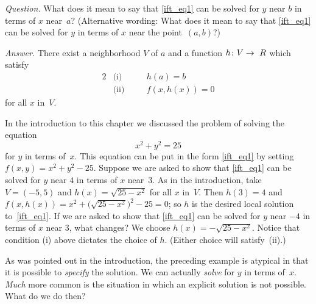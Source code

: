 \noindent\emph{Question.} What does it mean to say that \eqref{ift_eq1} can be solved for $y$
near $b$ in terms of $x$ near~$a$?  (Alternative wording: What does it mean to say that
\eqref{ift_eq1} can be solved for $y$ in terms of $x$ near the point~$(a,b)$?)

\noindent\emph{Answer.} There exist a neighborhood $V$ of $a$ and a function  $h \colon V \rightarrow
\ R$ which satisfy
  \begin{alignat*}{2}
    &\text{(i)}  &&\quad h(a) = b\\
    &\text{(ii)} &&\quad f(x,h(x)) = 0
  \end{alignat*}
for all $x$ in~$V$.

\begin{exam} In the introduction to this chapter we discussed the problem of solving the equation
  \[ x^2 + y^2 = 25 \]
for $y$ in terms of~$x$.  This equation can be put in the form \eqref{ift_eq1} by setting
$f(x,y) = x^2 + y^2 - 25$.  Suppose we are asked to show that \eqref{ift_eq1} can be solved
for $y$ near $4$ in terms of $x$ near~$3$.  As in the introduction, take $V = (- 5,5)$ and
$h(x) = \sqrt{25 - x^2}$ for all $x$ in~$V$.  Then $h(3) = 4$ and $f(x,h(x)) = x^2 +
\bigl(\sqrt{25 - x^2}\bigr)^2 -25 = 0$; so $h$ is the desired local solution
to~\eqref{ift_eq1}. If we are asked to show that \eqref{ift_eq1} can be solved for $y$ near
$-4$ in terms of $x$ near 3, what changes? We choose $h(x) = -\sqrt{25 - x^2}$.  Notice that
condition (i) above dictates the choice of $h$. (Either choice will satisfy~(ii).)
\end{exam}

As was pointed out in the introduction, the preceding example is atypical in that it is
possible to \emph{specify} the solution. We can actually \emph{solve} for $y$ in terms of~$x$.
\emph{Much} more common is the situation in which an explicit solution is not possible.  What
do we do then?

